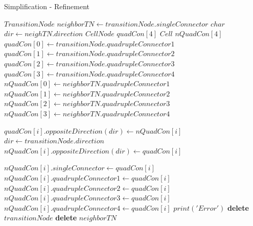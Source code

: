 \begin{algorithm}[!hb]
    \caption{Simplification - Refinement}
    \small{
    \begin{algorithmic}[1]
            \State
            \State $TransitionNode$ $neighborTN \gets transitionNode.singleConnector$
            \State $char$ $dir \gets neighTN.direction$
            \State $CellNode$ $quadCon[4]$ 
            \State $Cell$ $nQuadCon[4]$ 
            \State
            \State $quadCon[0] \gets transitionNode.quadrupleConnector1$
            \State $quadCon[1] \gets transitionNode.quadrupleConnector2$
            \State $quadCon[2] \gets transitionNode.quadrupleConnector3$
            \State $quadCon[3] \gets transitionNode.quadrupleConnector4$
            \State
            \State $nQuadCon[0] \gets neighborTN.quadrupleConnector1$
            \State $nQuadCon[1] \gets neighborTN.quadrupleConnector2$
            \State $nQuadCon[2] \gets neighborTN.quadrupleConnector3$
            \State $nQuadCon[3] \gets neighborTN.quadrupleConnector4$

            \State
                \State $quadCon[i].oppositeDirection(dir) \gets nQuadCon[i]$
            \EndFor
            \State $dir \gets transitionNode.direction$
                    \State $nQuadCon[i].oppositeDirection(dir) \gets quadCon[i]$
                \Else

                        \State $nQuadCon[i].singleConnector \gets quadCon[i]$
                        \State $nQuadCon[i].quadrupleConnector1 \gets quadCon[i]$
                        \State $nQuadCon[i].quadrupleConnector2 \gets quadCon[i]$
                        \State $nQuadCon[i].quadrupleConnector3 \gets quadCon[i]$
                        \State $nQuadCon[i].quadrupleConnector4 \gets quadCon[i]$
                    \Else
                        \State $print('Error')$
                    \EndIf
                \EndIf
            \EndFor
            \State
            \State \textbf{delete} $transitionNode$
            \State \textbf{delete} $neighborTN$
        \EndIf
    \EndIf
    \EndProcedure
    \end{algorithmic}
    }
    \label{SIMPLIFICATION_REFINEMENT}
\end{algorithm}

